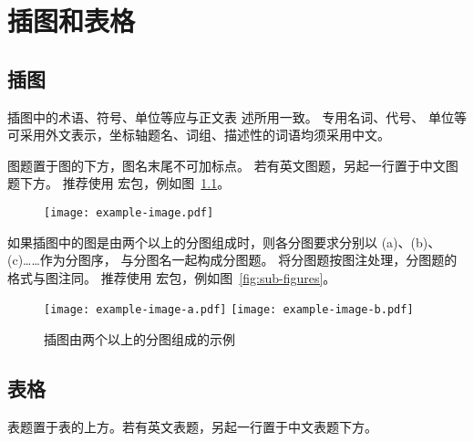 
\chapter{插图和表格}

\section{插图}

插图中的术语、符号、单位等应与正文表 述所用一致。
专用名词、代号、 单位等可采用外文表示，坐标轴题名、词组、描述性的词语均须采用中文。

图题置于图的下方，图名末尾不可加标点。
若有英文图题，另起一行置于中文图题下方。
推荐使用  宏包，例如图~\ref{fig:example}。

\begin{figure}[h]
  \centering
  \texttt{[image: example-image.pdf]}
  \label{fig:example}
\end{figure}

如果插图中的图是由两个以上的分图组成时，则各分图要求分别以 (a)、(b)、(c)……作为分图序，
与分图名一起构成分图题。
将分图题按图注处理，分图题的格式与图注同。
推荐使用  宏包，例如图~\ref{fig:sub-figures}。

\begin{figure}[h]
  \centering
    {\texttt{[image: example-image-a.pdf]}}
    {\texttt{[image: example-image-b.pdf]}}
  \caption{插图由两个以上的分图组成的示例}
  \label{fig:sub-figs}
\end{figure}


\section{表格}

表题置于表的上方。若有英文表题，另起一行置于中文表题下方。

